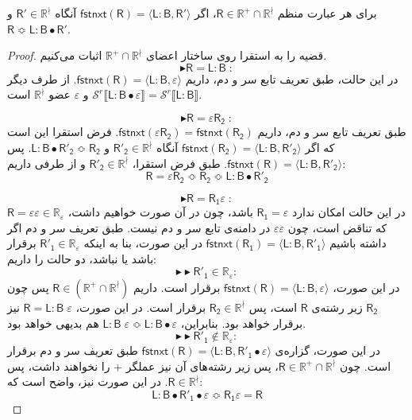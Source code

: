 \begin{thm}
	برای هر عبارت منظم 
	$\mathsf{R} \in \mathbb{R^+ \cap R^\nmid}$،
	اگر 
	$\mathsf{fstnxt(R)=\langle L:B , R'\rangle}$
		آنگاه 
	$\mathsf{R'}\in \mathbb{R}^\nmid$
	و 
	$\mathsf{R \Bumpeq L:B\bullet R'}$.
\end{thm}
\begin{proof}
	قضیه را به استقرا روی ساختار اعضای 
	$\mathbb{R^+ \cap R^\nmid}$
	اثبات می‌کنیم.
	$$\blacktriangleright\mathsf{R=L:B\;:}$$
	در این حالت، طبق تعریف تابع سر و دم، داریم
	$\mathsf{fstnxt(R)=\langle L:B , \varepsilon \rangle}$.
	از طرف دیگر \break
	$\mathcal{S}^r\llbracket \mathsf{L:B \bullet \varepsilon} \rrbracket = 
	\mathcal{S}^r \llbracket \mathsf{L:B} \rrbracket$
	و $\varepsilon$ عضو $\mathbb{R^\nmid}$ است.
	
	$$\blacktriangleright\mathsf{R=\varepsilon R_2\;:}$$
	طبق تعریف تابع سر و دم، داریم
	$\mathsf{fstnxt(\varepsilon R_2) = fstnxt(R_2)}$.
		فرض استقرا این است که اگر 
		$\mathsf{fstnxt(R_2)=\langle L:B, R'_2 \rangle}$
	آنگاه 
	$\mathsf{R'_2}\in \mathbb{R^\nmid}$
	و
	$\mathsf{L:B \bullet R'_2} \Bumpeq  \mathsf{R_2}$.
	پس 
	$\mathsf{fstnxt(R)=\langle L:B , R'_2 \rangle}$.
	طبق فرض استقرا، 
	$\mathsf{R'_2} \in \mathbb{R^\nmid}$
	و از طرفی داریم:
	$$\mathsf{R=\varepsilon R_2 \Bumpeq R_2 \Bumpeq L:B \bullet R'_2 }$$
			
	
	
	
	
	
	$$\blacktriangleright\mathsf{R=R_1 \varepsilon\;:}$$
	در این حالت امکان ندارد $\mathsf{R_1=\varepsilon}$ باشد، چون در آن صورت خواهیم داشت، 
	$\mathsf{R=\varepsilon \varepsilon} \in \mathbb{R_\varepsilon}$
	که تناقض است، چون $\varepsilon \varepsilon$ در دامنه‌ی تابع سر و دم نیست.
	طبق تعریف سر و دم اگر داشته باشیم 
	$\mathsf {fstnxt(R_1)=\langle L:B , R'_1 \rangle}$
در این صورت، بنا به اینکه 
$\mathsf{R'_1} \in \mathbb{R_\varepsilon}$
برقرار باشد یا نباشد، دو حالت را داریم:
	$$\blacktriangleright\blacktriangleright \mathsf{R'_1} \in \mathbb{R_\varepsilon}: $$
	در این صورت، 
	$\mathsf{fstnxt(R)=\langle L:B , \varepsilon \rangle}$
برقرار است. داریم
 $\mathsf{R} \in \mathbb{( \mathbb{R^+ \cap R^\nmid})}$
  پس 
  چون
  $\mathsf{R_2}$
  زیر رشته‌ی $\mathsf{R}$ است، پس
  $\mathsf{R_2 \in} \mathbb{R^\nmid}$
  برقرار است. در این صورت، $\mathsf{R=L:B\;\varepsilon}$ نیز برقرار خواهد بود. بنابراین،
  $\mathsf{L:B\;\varepsilon \Bumpeq L:B \bullet \varepsilon}$
  هم بدیهی خواهد بود.
  $$\blacktriangleright\blacktriangleright \mathsf{R'_1} \notin \mathbb{R_\varepsilon}: $$
در این صورت، گزاره‌ی 
$\mathsf{fstnxt(R)=\langle L:B , R'_1 \bullet \varepsilon \rangle}$
طبق تعریف سر و دم برقرار است. چون 
$\mathsf{R} \in \mathbb{R^+ \cap R^\nmid}$،
پس زیر رشته‌های آن نیز عملگر $+$ را نخواهند داشت، پس 
$\mathsf{R} \in \mathbb{R^\nmid}$.
در این صورت نیز، واضح است که:
$$\mathsf{L:B \bullet R'_1 \bullet \varepsilon \Bumpeq R_1 \varepsilon = R }$$



\end{proof}
